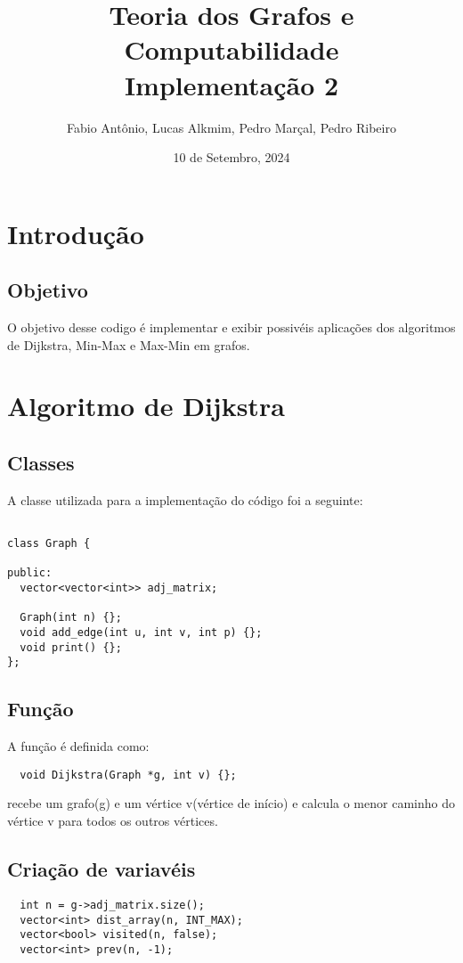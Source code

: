 \documentclass{article}
\title{\Huge{Teoria dos Grafos e Computabilidade}\\Implementação 2}
\author{{Fabio Antônio, Lucas Alkmim, Pedro Marçal, Pedro Ribeiro}}
\date{10 de Setembro, 2024}
\begin{document}
\maketitle
\newpage

\renewcommand{\contentsname}{Conteúdo}
\tableofcontents

\pagebreak

\section{Introdução}

\subsection{Objetivo}
O objetivo desse codigo é implementar e exibir possivéis aplicações dos algoritmos de Dijkstra, Min-Max e Max-Min em grafos.
\section{Algoritmo de Dijkstra}

\subsection{Classes}

A classe utilizada para a implementação do código foi a seguinte:

\begin{lstlisting} 

class Graph {

public:
  vector<vector<int>> adj_matrix;

  Graph(int n) {};
  void add_edge(int u, int v, int p) {};
  void print() {};
};

\end{lstlisting}

\subsection{Função}
A função é definida como:
\begin{lstlisting}
  void Dijkstra(Graph *g, int v) {};
\end{lstlisting}
recebe um grafo(g) e um vértice v(vértice de início) e calcula o menor caminho do vértice v para todos os outros vértices.


\subsection{Criação de variavéis}
\begin{lstlisting}
  int n = g->adj_matrix.size();
  vector<int> dist_array(n, INT_MAX);
  vector<bool> visited(n, false);
  vector<int> prev(n, -1);

\end{lstlisting}
\end{document}
